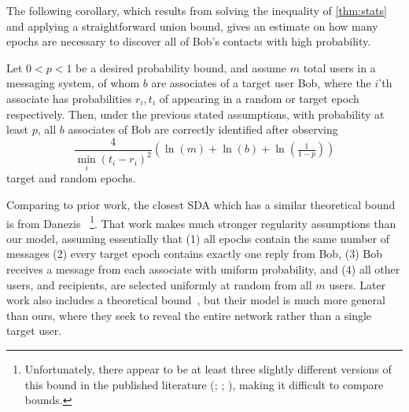 The following corollary, which results from solving the inequality of
\cref{thm:stats} and applying a straightforward union bound, gives an
estimate on how many epochs are necessary to discover all of Bob's
contacts with high probability.

\begin{cor}\label{cor:epochs}
  Let $0<p<1$ be a desired probability bound, and
  assume $m$ total users in a messaging system, of whom $b$ are
  associates of a target user Bob, where the $i$'th associate has
  probabilities $r_i,t_i$ of appearing in a random or target epoch
  respectively. Then, under the previous stated assumptions, with
  probability at least $p$, all $b$ associates of Bob are correctly
  identified after observing
  \[\frac{4}{\min_i (t_i-r_i)^2}\left(
    \ln(m) + \ln(b) + \ln\left(\tfrac{1}{1-p}\right)
  \right)\]
  target and random epochs.
\end{cor}

Comparing to prior work, the closest SDA which has a similar theoretical
bound is from Danezis~\cite{SDA}%
\footnote{Unfortunately, there appear to be at least three slightly different
versions of this bound in the published literature
(\cite[equation (6)]{SDA}; \cite[equation (9.8)]{danezis-thesis};
\cite[page 5]{SDA-MD05}), making it difficult to compare bounds.}.
That work makes much stronger regularity assumptions than our model,
assuming essentially that (1) all epochs contain the same number of
messages (2) every target epoch contains exactly one reply from Bob, (3)
Bob receives a message from each associate with uniform probability, and
(4) all other users, and recipients, are selected uniformly at random
from all $m$ users. Later work also includes a
theoretical bound~\cite{LSDA}, but their model is much more general than ours, where
they seek to reveal the entire network rather than a single target
user.




